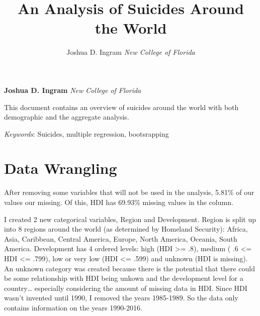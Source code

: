 \documentclass[11pt,]{article}
\title{An Analysis of Suicides Around the World  }
\author{\Large Joshua D. Ingram\vspace{0.05in} \newline\normalsize\emph{New College of Florida}  }
\date{}
\newcommand*{\authorfont}{\fontfamily{phv}\selectfont}
\renewenvironment{abstract}
 {{%
    \setlength{\leftmargin}{0mm}
    \setlength{\rightmargin}{\leftmargin}%
  }%
  \relax}
 {\endlist}
\begin{document}
	
%

{%
\setlength{\parindent}{0pt}
\thispagestyle{plain}
{\fontsize{18}{20}\selectfont\raggedright 
\maketitle  %

}

{
   \vskip 13.5pt\relax \normalsize\fontsize{11}{12} 
\textbf{\authorfont Joshua D. Ingram} \hskip 15pt \emph{\small New College of Florida}   

}

}








\begin{abstract}

    \hbox{\vrule height .2pt width 39.14pc}

    \vskip 8.5pt %

\noindent This document contains an overview of suicides around the world with
both demographic and the aggregate analysis.


\vskip 8.5pt \noindent \emph{Keywords}: Suicides, multiple regression, bootsrapping \par

    \hbox{\vrule height .2pt width 39.14pc}



\end{abstract}


\vskip -8.5pt



\noindent  

\hypertarget{data-wrangling}{%
\section{Data Wrangling}\label{data-wrangling}}

After removing some variables that will not be used in the analysis,
5.81\% of our values our missing. Of this, HDI has 69.93\% missing
values in the column.

I created 2 new categorical variables, Region and Development. Region is
split up into 8 regions around the world (as determined by Homeland
Security): Africa, Asia, Caribbean, Central America, Europe, North
America, Oceania, South America. Development has 4 ordered levels: high
(HDI \textgreater= .8), medium ( .6 \textless= HDI \textless= .799), low
or very low (HDI \textless= .599) and unknown (HDI is missing). An
unknown category was created because there is the potential that there
could be some relationship with HDI being unkown and the development
level for a country\ldots{} especially considering the amount of missing
data in HDI. Since HDI wasn't invented until 1990, I removed the years
1985-1989. So the data only contains information on the years 1990-2016.
\end{document}
